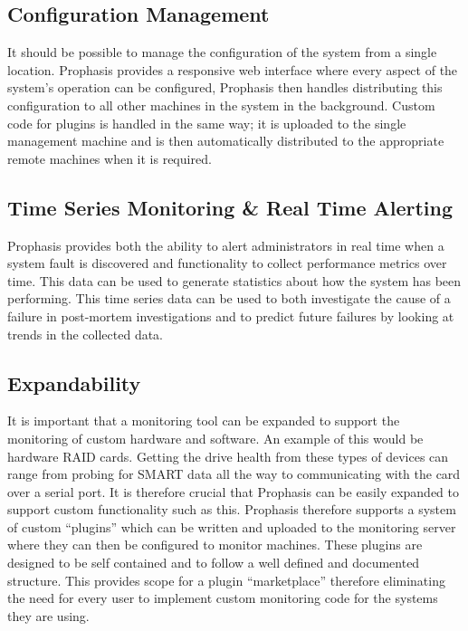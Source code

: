 \documentclass[bsc,deptreport,twoside,parskip,singlespacing,notimes]{infthesis}
\begin{document}
\subsection{Configuration Management}

	It should be possible to manage the configuration of the system from a single
	location.  Prophasis provides a responsive web interface where every
	aspect of the system's operation can be configured, Prophasis then handles
	distributing this configuration to all other machines in the system in the
	background. Custom code for plugins is handled in the same way; it is uploaded
	to the single management machine and is then automatically distributed to the
	appropriate remote machines when it is required.

\subsection{Time Series Monitoring \& Real Time Alerting}

	Prophasis provides both the ability to alert administrators in real time when a
	system fault is discovered and functionality to collect
	performance metrics over time. This data can be used to generate statistics about
	how the system has been performing.  This time series data can be used to both
	investigate the cause of a failure in post-mortem investigations and to predict
	future failures by looking at trends in the	collected data.

\subsection{Expandability}

	It is important that a monitoring tool can be expanded to support the
	monitoring of custom hardware and software.  An example of this would be
	hardware RAID cards.  Getting the drive health from these types of devices can
	range from probing for SMART data all the way to communicating with the card
	over a serial port.  It is therefore crucial that Prophasis can be easily
	expanded to support custom functionality such as this. Prophasis therefore
	supports a system of custom ``plugins'' which can be written and uploaded to the
	monitoring server where they can then be configured to monitor machines. These
	plugins are designed to be self contained and to follow a well defined and
	documented structure.  This provides scope for a plugin ``marketplace'' therefore
	eliminating the need for every user to implement custom monitoring code for the
	systems they are using.
\end{document}
